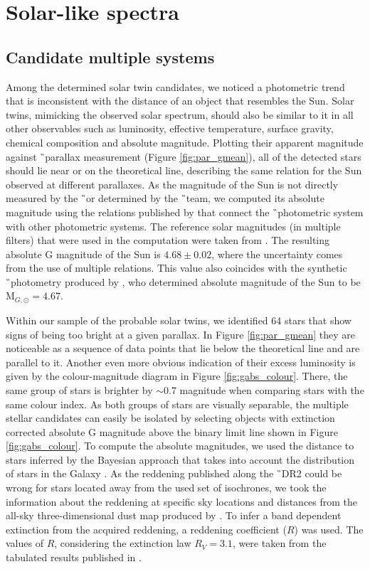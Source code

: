 \section{Solar-like spectra}
\subsection{Candidate multiple systems}
\label{sec:multi_cand}
Among the determined solar twin candidates, we noticed a photometric trend that is inconsistent with the distance of an object that resembles the Sun. Solar twins, mimicking the observed solar spectrum, should also be similar to it in all other observables such as luminosity, effective temperature, surface gravity, chemical composition and absolute magnitude. Plotting their apparent magnitude against \G\ parallax measurement (Figure \ref{fig:par_gmean}), all of the detected stars should lie near or on the theoretical line, describing the same relation for the Sun observed at different parallaxes. As the magnitude of the Sun is not directly measured by the \G\ or determined by the \G\ team, we computed its absolute magnitude using the relations published by \citet{2018arXiv180409368E} that connect the \G\ photometric system with other photometric systems. The reference solar magnitudes (in multiple filters) that were used in the computation were taken from \citet{2018ApJS..236...47W}. The resulting absolute G magnitude of the Sun is $4.68 \pm 0.02$, where the uncertainty comes from the use of multiple relations. This value also coincides with the synthetic \G\ photometry produced by \citet{2018MNRAS.479L.102C}, who determined absolute magnitude of the Sun to be M$_{G, \odot} = 4.67$.

Within our sample of the probable solar twins, we identified 64 stars that show signs of being too bright at a given parallax. In Figure \ref{fig:par_gmean} they are noticeable as a sequence of data points that lie below the theoretical line and are parallel to it. Another even more obvious indication of their excess luminosity is given by the colour-magnitude diagram in Figure \ref{fig:gabs_colour}. There, the same group of stars is brighter by $\sim$0.7 magnitude when comparing stars with the same colour index. As both groups of stars are visually separable, the multiple stellar candidates can easily be isolated by selecting objects with extinction corrected absolute G magnitude above the binary limit line shown in Figure \ref{fig:gabs_colour}. To compute the absolute magnitudes, we used the distance to stars inferred by the Bayesian approach that takes into account the distribution of stars in the Galaxy \citep{2018AJ....156...58B}. As the reddening published along the \G\ DR2 \citep{2018A&A...616A...8A} could be wrong for stars located away from the used set of isochrones, we took the information about the reddening at specific sky locations and distances from the all-sky three-dimensional dust map produced by \citet{2017A&A...606A..65C}. To infer a band dependent extinction from the acquired reddening, a reddening coefficient ($R$) was used. The values of $R$, considering the extinction law $R_V = 3.1$, were taken from the tabulated results published in \citet{2011ApJ...737..103S}. 


